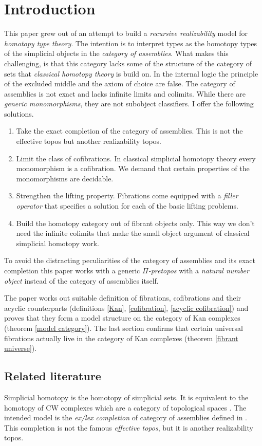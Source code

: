 \documentclass[csh.tex]{subfiles}
\begin{document}
\section{Introduction}
This paper grew out of an attempt to build a \emph{recursive realizability} model for \emph{homotopy type theory}. The intention is to interpret types as the homotopy types of the simplicial objects in the \emph{category of assemblies}. What makes this challenging, is that this category lacks some of the structure of the category of sets that \emph{classical homotopy theory} is build on. In the internal logic the principle of the excluded middle and the axiom of choice are false. The category of assemblies is not exact and lacks infinite limits and colimits. While there are \emph{generic monomorphisms}, they are not subobject classifiers. I offer the following solutions.
\begin{enumerate}
\item Take the exact completion of the category of assemblies. This is not the effective topos but another realizability topos.
\item Limit the class of cofibrations. In classical simplicial homotopy theory every mono\-morphism is a cofibration. We demand that certain properties of the monomorphisms are decidable.
\item Strengthen the lifting property. Fibrations come equipped with a \emph{filler operator} that specifies a solution for each of the basic lifting problems.
\item Build the homotopy category out of fibrant objects only. This way we don't need the infinite colimits that make the small object argument of classical simplicial homotopy work.
\end{enumerate}
To avoid the distracting peculiarities of the category of assemblies and its exact completion this paper works with a generic \emph{$\Pi$-pretopos} with a \emph{natural number object} instead of the category of assemblies itself.

The paper works out suitable definition of fibrations, cofibrations and their acyclic counterparts (definitions \ref{Kan}, \ref{cofibration}, \ref{acyclic cofibration}) and proves that they form a model structure on the category of Kan complexes (theorem \ref{model category}). The last section confirms that certain universal fibrations actually live in the category of Kan complexes (theorem \ref{fibrant universe}). 

\subsection{Related literature}
Simplicial homotopy is the homotopy of simplicial sets. It is equivalent to the homotopy of CW complexes which are a category of topological spaces \citep{Hovey99,GJSHT}. The intended model is the \emph{ex/lex completion} \citep{MR1600009} of category of assemblies defined in \citep{MR1097022,MR1023803,MR2479466}. This completion is not the famous \emph{effective topos}, but it is another realizability topos. 
\end{document}
